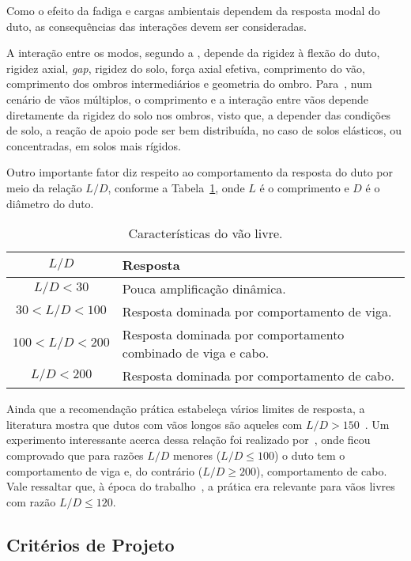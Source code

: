Como o efeito da fadiga e cargas ambientais dependem da resposta modal do duto, as consequências das interações devem ser consideradas.

A interação entre os modos, segundo a , depende da rigidez à flexão do duto, rigidez axial, \textit{gap}, rigidez do solo, força axial efetiva, comprimento do vão, comprimento dos ombros intermediários e geometria do ombro. Para~\citet{Ilstad2005}, num cenário de vãos múltiplos, o comprimento e a interação entre vãos depende diretamente da rigidez do solo nos ombros, visto que, a depender das condições de solo, a reação de apoio pode ser bem distribuída, no caso de solos elásticos, ou concentradas, em solos mais rígidos.

Outro importante fator diz respeito ao comportamento da resposta do duto por meio da relação $L/D$, conforme a Tabela~\ref{tab:jdsn-caracvao}, onde $L$ é o comprimento e $D$ é o diâmetro do duto.

\begin{table}[H]
	\renewcommand{\arraystretch}{1.2} 
 	\small
 	\centering
 	\caption{Características do vão livre.}
 	\label{tab:jdsn-caracvao}
 	\begin{tabular}{cl}
	 	\toprule
	 	$L/D$             & Resposta\\
	 	\midrule
	 	\rowcolor{gray!20}
	 	$L/D < 30$        & Pouca amplificação dinâmica. \\
	 	$30 < L/D < 100$  & Resposta dominada por comportamento de viga. \\
	 	\rowcolor{gray!20}
	 	$100 < L/D < 200$ & Resposta dominada por comportamento combinado de viga e cabo. \\
	 	$L/D < 200$       & Resposta dominada por comportamento de cabo. \\
	 	\bottomrule
 	\end{tabular}
\end{table}

Ainda que a recomendação prática estabeleça vários limites de resposta, a literatura mostra que dutos com vãos longos são aqueles com $L/D > 150$~\cite{Ilstad2005}. 
Um experimento interessante acerca dessa relação foi realizado por~\citet{Nielsen2002}, onde ficou comprovado que para razões $L/D$ menores ($L/D \leq 100$) o duto tem o comportamento de viga e, do contrário ($L/D \geq 200$), comportamento de cabo. 
Vale ressaltar que, à época do trabalho~\cite{Nielsen2002}, a prática era relevante para vãos livres com razão $L/D \leq 120$.

\subsection{Critérios de Projeto}

